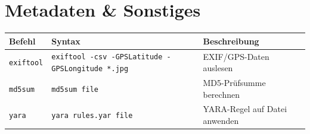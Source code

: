 \section{Metadaten \& Sonstiges}

{\small
\begin{tabular}{@{}p{2.2cm} p{7.8cm} p{4.5cm}@{}}
\toprule
\textbf{Befehl} & \textbf{Syntax} & \textbf{Beschreibung} \\
\midrule
\texttt{exiftool} & \texttt{exiftool -csv -GPSLatitude -GPSLongitude *.jpg} & EXIF/GPS-Daten auslesen \\
\texttt{md5sum} & \texttt{md5sum file} & MD5-Prüfsumme berechnen \\
\texttt{yara} & \texttt{yara rules.yar file} & YARA-Regel auf Datei anwenden \\
\bottomrule
\end{tabular}
}
